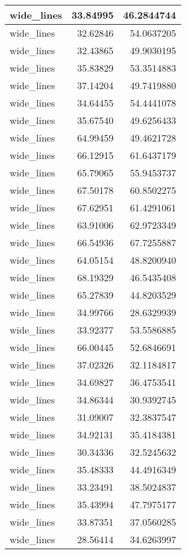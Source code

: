 \documentclass[
]{book}
\theoremstyle{definition}
\theoremstyle{definition}
\theoremstyle{definition}
\theoremstyle{definition}
\theoremstyle{remark}
\begin{document}
\begin{tabular}{l|r|r}
\hline
wide\_lines & 33.84995 & 46.2844744\\
\hline
wide\_lines & 32.62846 & 54.0637205\\
\hline
wide\_lines & 32.43865 & 49.9030195\\
\hline
wide\_lines & 35.83829 & 53.3514883\\
\hline
wide\_lines & 37.14204 & 49.7419880\\
\hline
wide\_lines & 34.64455 & 54.4441078\\
\hline
wide\_lines & 35.67540 & 49.6256433\\
\hline
wide\_lines & 64.99459 & 49.4621728\\
\hline
wide\_lines & 66.12915 & 61.6437179\\
\hline
wide\_lines & 65.79065 & 55.9453737\\
\hline
wide\_lines & 67.50178 & 60.8502275\\
\hline
wide\_lines & 67.62951 & 61.4291061\\
\hline
wide\_lines & 63.91006 & 62.9723349\\
\hline
wide\_lines & 66.54936 & 67.7255887\\
\hline
wide\_lines & 64.05154 & 48.8200940\\
\hline
wide\_lines & 68.19329 & 46.5435408\\
\hline
wide\_lines & 65.27839 & 44.8203529\\
\hline
wide\_lines & 34.99766 & 28.6329939\\
\hline
wide\_lines & 33.92377 & 53.5586885\\
\hline
wide\_lines & 66.00445 & 52.6846691\\
\hline
wide\_lines & 37.02326 & 32.1184817\\
\hline
wide\_lines & 34.69827 & 36.4753541\\
\hline
wide\_lines & 34.86344 & 30.9392745\\
\hline
wide\_lines & 31.09007 & 32.3837547\\
\hline
wide\_lines & 34.92131 & 35.4184381\\
\hline
wide\_lines & 30.34336 & 32.5245632\\
\hline
wide\_lines & 35.48333 & 44.4916349\\
\hline
wide\_lines & 33.23491 & 38.5024837\\
\hline
wide\_lines & 35.43994 & 47.7975177\\
\hline
wide\_lines & 33.87351 & 37.0560285\\
\hline
wide\_lines & 28.56414 & 34.6263997\\

\end{tabular}
\end{document}
